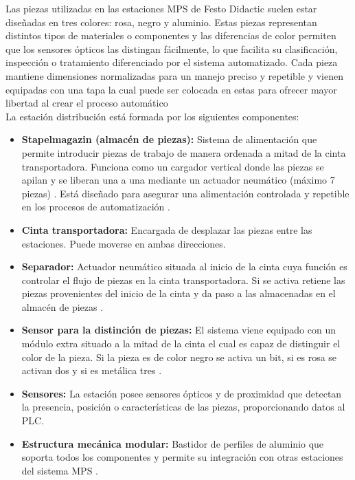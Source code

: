 \clearpage

Las piezas utilizadas en las estaciones MPS de Festo Didactic suelen estar diseñadas en tres colores: rosa, negro y aluminio. Estas piezas representan distintos tipos de materiales o componentes y las diferencias de color permiten que los sensores ópticos las distingan fácilmente, lo que facilita su clasificación, inspección o tratamiento diferenciado por el sistema automatizado. Cada pieza mantiene dimensiones normalizadas para un manejo preciso y repetible y vienen equipadas con una tapa la cual puede ser colocada en estas para ofrecer mayor libertad al crear el proceso automático \\

La estación distribución está formada por los siguientes componentes:

\begin{itemize}
   \item \textbf{Stapelmagazin (almacén de piezas):} Sistema de alimentación que permite introducir piezas de trabajo de manera ordenada a mitad de la cinta transportadora. Funciona como un cargador vertical donde las piezas se apilan y se liberan una a una mediante un actuador neumático (máximo 7 piezas) \cite{estacion_distribucion}. Está diseñado para asegurar una alimentación controlada y repetible en los procesos de automatización \cite{estacion_distribucion}.
   
    \item \textbf{Cinta transportadora:} Encargada de desplazar las piezas entre las estaciones. Puede moverse en ambas direcciones. 
    
     \item \textbf{Separador:} Actuador neumático situada al inicio de la cinta cuya función es controlar el flujo de piezas en la cinta transportadora. Si se activa retiene las piezas provenientes del inicio de la cinta y da paso a las almacenadas en el almacén de piezas \cite{estacion_distribucion}.
     
      \item \textbf{Sensor para la distinción de piezas:} El sistema viene equipado con un módulo extra situado a la mitad de la cinta el cual es capaz de distinguir el color de la pieza. Si la pieza es de color negro se activa un bit, si es rosa se activan dos y si es metálica tres \cite{estacion_distribucion}.

    \item \textbf{Sensores:} La estación posee sensores ópticos y de proximidad que detectan la presencia, posición o características de las piezas, proporcionando datos al PLC.

    \item \textbf{Estructura mecánica modular:} Bastidor de perfiles de aluminio que soporta todos los componentes y permite su integración con otras estaciones del sistema MPS \cite{estacion_distribucion}.
\end{itemize}

